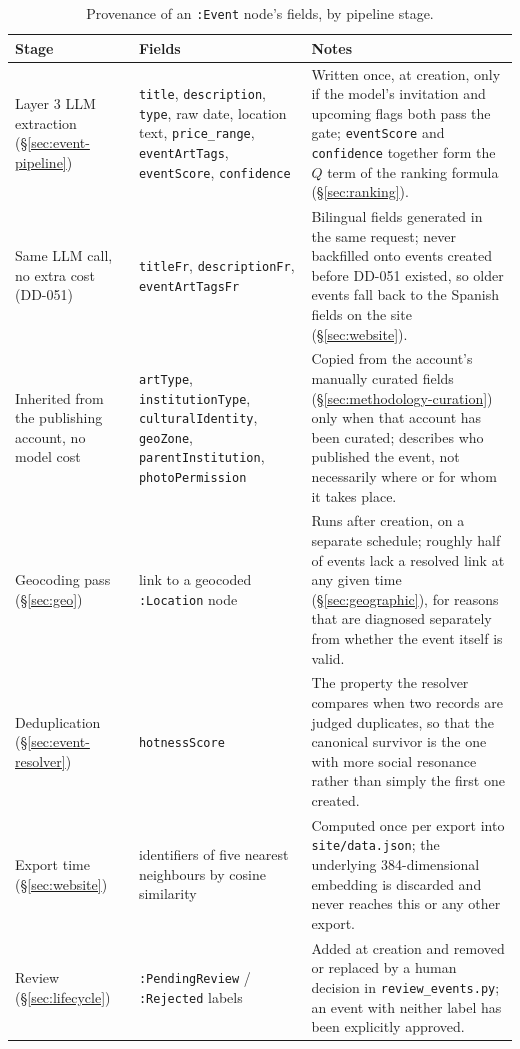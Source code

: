 \documentclass[12pt, a4paper]{report}
\begin{document}
\begin{table}[htbp]
\centering
\caption{Provenance of an \texttt{:Event} node's fields, by pipeline
stage.}
\label{tab:event-anatomy}
\small
\begin{tabular}{p{3.1cm}p{3.3cm}p{7.2cm}}
\toprule
Stage & Fields & Notes \\
\midrule
Layer 3 LLM extraction (\S\ref{sec:event-pipeline}) &
\texttt{title}, \texttt{description}, \texttt{type}, raw date, location
text, \texttt{price\_range}, \texttt{eventArtTags},
\texttt{eventScore}, \texttt{confidence} &
Written once, at creation, only if the model's invitation and upcoming
flags both pass the gate; \texttt{eventScore} and \texttt{confidence}
together form the $Q$ term of the ranking formula (\S\ref{sec:ranking}). \\
Same LLM call, no extra cost (DD-051) &
\texttt{titleFr}, \texttt{descriptionFr}, \texttt{eventArtTagsFr} &
Bilingual fields generated in the same request; never backfilled onto
events created before DD-051 existed, so older events fall back to the
Spanish fields on the site (\S\ref{sec:website}). \\
Inherited from the publishing account, no model cost &
\texttt{artType}, \texttt{institutionType}, \texttt{culturalIdentity},
\texttt{geoZone}, \texttt{parentInstitution}, \texttt{photoPermission} &
Copied from the account's manually curated fields
(\S\ref{sec:methodology-curation}) only when that account has been
curated; describes who published the event, not necessarily where or for
whom it takes place. \\
Geocoding pass (\S\ref{sec:geo}) &
link to a geocoded \texttt{:Location} node &
Runs after creation, on a separate schedule; roughly half of events lack
a resolved link at any given time (\S\ref{sec:geographic}), for reasons
that are diagnosed separately from whether the event itself is valid. \\
Deduplication (\S\ref{sec:event-resolver}) &
\texttt{hotnessScore} &
The property the resolver compares when two records are judged
duplicates, so that the canonical survivor is the one with more social
resonance rather than simply the first one created. \\
Export time (\S\ref{sec:website}) &
identifiers of five nearest neighbours by cosine similarity &
Computed once per export into \texttt{site/data.json}; the underlying
384-dimensional embedding is discarded and never reaches this or any
other export. \\
Review (\S\ref{sec:lifecycle}) &
\texttt{:PendingReview} / \texttt{:Rejected} labels &
Added at creation and removed or replaced by a human decision in
\texttt{review\_events.py}; an event with neither label has been
explicitly approved. \\
\bottomrule
\end{tabular}
\end{table}
\end{document}
